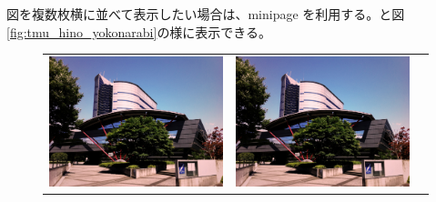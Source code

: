 \documentclass[a4paper]{jsarticle}
\begin{document}
図を複数枚横に並べて表示したい場合は、minipage を利用する。と図\ref{fig:tmu_hino_yokonarabi}の様に表示できる。

\begin{figure}[tb]
  \begin{center}
    \begin{tabular}{ccc}

    \begin{minipage}{0.3\hsize}
	\includegraphics[width=\hsize]{./images/sample.jpg}
    \end{minipage}
    &
    \begin{minipage}{0.3\hsize}
      \includegraphics[width=\hsize]{./images/sample.jpg}
    \end{minipage}

\end{tabular}
\end{center}
\end{figure}
\end{document}
